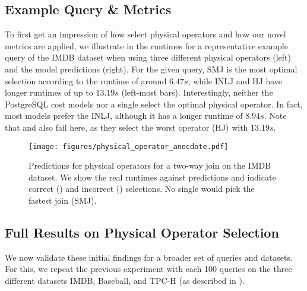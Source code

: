 \subsection{Example Query \& Metrics} \label{subsec:physical_operator_anecdotal}
\noindent To first get an impression of how \lcms select physical operators and how our novel metrics are applied, we illustrate in  the runtimes for a representative example query of the IMDB dataset when using three different physical operators (left) and the model predictions (right).
For the given query, SMJ is the most optimal selection according to the runtime of around $6.47s$, while INLJ and HJ have longer runtimes of up to $13.19s$ (left-most bars).
Interestingly, neither the PostgreSQL cost models nor a single \lcm select the optimal physical operator.
In fact, most models prefer the INLJ, although it has a longer runtime of $8.94s$.
Note that \postgresx and \postgresxvi also fail here, as they select the worst operator (HJ) with $13.19s$.
\begin{figure}
    \centering
    \texttt{[image: figures/physical\_operator\_anecdote.pdf]}
    \caption{Predictions for physical operators for a two-way join on the IMDB dataset. 
    We show the real runtimes against \lcm predictions and indicate correct (\checkmark) and incorrect () selections. 
    No single \lcm would pick the fastest join (SMJ).}
\label{fig:physical_operator_anecdote}
\end{figure}
\subsection{Full Results on Physical Operator Selection}
\label{sec:physical_operator_full}
We now validate these initial findings for a broader set of queries and datasets.
For this, we repeat the previous experiment with each 100 queries on the three different datasets IMDB, Baseball, and TPC-H (as described in ).


